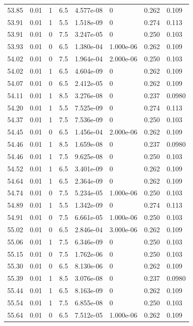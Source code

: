 \documentclass[preview]{standalone}
\begin{document}
{{{{{{{{{{{{{{{{{{\begin{tabular}{L{1.2cm}C{1.2cm} C{0.3cm}C{0.5cm} C{1.4cm}C{1.4cm} C{1.4cm}C{1.4cm}}
  53.85  &  0.01  & 1     & 6.5 &  4.577e-08  & 0  & 0.262 &  0.109   \\ 
  53.91  &  0.01  & 1     & 5.5 &  1.518e-09  & 0  & 0.274 &  0.113   \\ 
  53.91  &  0.01  & 0     & 7.5 &  3.247e-05  & 0  & 0.250 &  0.103   \\ 
  53.93  &  0.01  & 0     & 6.5 &  1.380e-04  & 1.000e-06  & 0.262 &  0.109   \\ 
  54.02  &  0.01  & 0     & 7.5 &  1.964e-04  & 2.000e-06  & 0.250 &  0.103   \\ 
  54.02  &  0.01  & 1     & 6.5 &  4.604e-09  & 0  & 0.262 &  0.109   \\ 
  54.07  &  0.01  & 0     & 6.5 &  2.412e-05  & 0  & 0.262 &  0.109   \\ 
  54.11  &  0.01  & 1     & 8.5 &  3.276e-08  & 0  & 0.237 &  0.0980   \\ 
  54.20  &  0.01  & 1     & 5.5 &  7.525e-09  & 0  & 0.274 &  0.113   \\ 
  54.37  &  0.01  & 1     & 7.5 &  7.536e-09  & 0  & 0.250 &  0.103   \\ 
  54.45  &  0.01  & 0     & 6.5 &  1.456e-04  & 2.000e-06  & 0.262 &  0.109   \\ 
  54.46  &  0.01  & 1     & 8.5 &  1.659e-08  & 0  & 0.237 &  0.0980   \\ 
  54.46  &  0.01  & 1     & 7.5 &  9.625e-08  & 0  & 0.250 &  0.103   \\ 
  54.52  &  0.01  & 1     & 6.5 &  3.401e-09  & 0  & 0.262 &  0.109   \\ 
  54.64  &  0.01  & 1     & 6.5 &  2.364e-09  & 0  & 0.262 &  0.109   \\ 
  54.74  &  0.01  & 0     & 7.5 &  5.234e-05  & 1.000e-06  & 0.250 &  0.103   \\ 
  54.89  &  0.01  & 1     & 5.5 &  1.342e-09  & 0  & 0.274 &  0.113   \\ 
  54.91  &  0.01  & 0     & 7.5 &  6.661e-05  & 1.000e-06  & 0.250 &  0.103   \\ 
  55.02  &  0.01  & 0     & 6.5 &  2.846e-04  & 3.000e-06  & 0.262 &  0.109   \\ 
  55.06  &  0.01  & 1     & 7.5 &  6.346e-09  & 0  & 0.250 &  0.103   \\ 
  55.15  &  0.01  & 0     & 7.5 &  1.762e-06  & 0  & 0.250 &  0.103   \\ 
  55.30  &  0.01  & 0     & 6.5 &  8.130e-06  & 0  & 0.262 &  0.109   \\ 
  55.39  &  0.01  & 1     & 8.5 &  3.076e-08  & 0  & 0.237 &  0.0980   \\ 
  55.44  &  0.01  & 1     & 6.5 &  8.163e-09  & 0  & 0.262 &  0.109   \\ 
  55.54  &  0.01  & 1     & 7.5 &  6.855e-08  & 0  & 0.250 &  0.103   \\ 
  55.64  &  0.01  & 0     & 6.5 &  7.512e-05  & 1.000e-06  & 0.262 &  0.109   \\ 
\hline 
\end{tabular} 

}}}}}}}}}}}}}}}}}}
\end{document}
